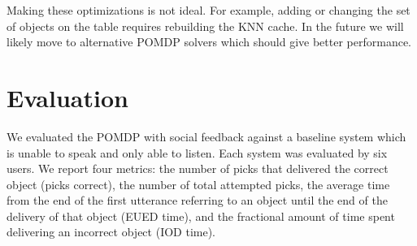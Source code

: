 \documentclass[letterpaper]{article}
\newcommand{\stnote}[1]{\textcolor{blue}{\textbf{ST: #1}}}
\begin{document}
Making these optimizations is not ideal. For example, adding or changing the set of objects on the table requires rebuilding the KNN cache.  In the future we will likely move to alternative POMDP solvers which should give better performance. 






\section{Evaluation}
We evaluated the POMDP with social feedback against a baseline system
which is unable to speak and only able to listen. Each system was evaluated
by six users. We report four metrics: the number of picks that delivered the correct object (picks correct), the number of total attempted picks, the average time from the end of the first utterance referring to an object
until the end of the delivery of that object (EUED time), and the fractional amount of time spent delivering an incorrect object (IOD time).
\end{document}
